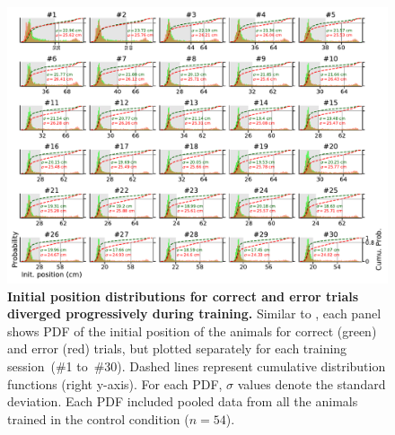 \begin{figure}[!h]
  \begin{center}
    \includegraphics[width=.8\linewidth]{ch-appendicies/figures/InitPos.pdf}
    \caption[Initial Position Evolution]
    {\textbf{Initial position distributions for correct and error trials diverged progressively during training.}
    Similar to , each panel shows PDF of the initial position of the animals for correct (green) and error (red) trials, but plotted separately for each training session~(\#1 to~\#30).
    Dashed lines represent cumulative distribution functions (right y-axis).
    For each PDF, $\sigma$ values denote the standard deviation.
    Each PDF included pooled data from all the animals trained in the control condition ($n=54$).
    }
    \label{fig:appendix:initPos}
  \end{center}
\end{figure}